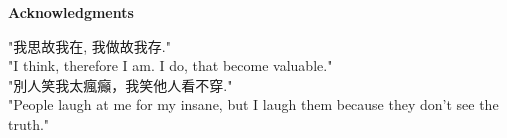 



\newpage
{}
{}


\begin{center}
\large \textbf{Acknowledgments}
\end{center}


"我思故我在, 我做故我存."\\
"I think, therefore I am. I do, that become valuable."\\

"別人笑我太瘋癲，我笑他人看不穿."\\
"People laugh at me for my insane, but I laugh them because they don't see the truth."\\



